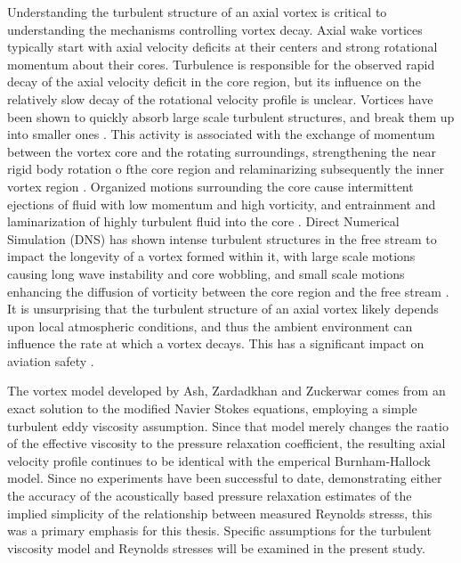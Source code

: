 Understanding the turbulent structure of an axial vortex is critical to 
understanding the mechanisms controlling vortex decay. Axial wake vortices 
typically 
start with axial velocity deficits at their centers and strong rotational 
momentum about their cores. Turbulence is responsible for the observed rapid 
decay of the axial velocity deficit in the core region, but its influence on 
the relatively slow decay of the rotational velocity profile is  unclear. 
Vortices have been shown to quickly absorb large 
scale turbulent structures, and break them up into smaller ones 
\cite{ragab1994,beninati2005}. This activity 
is associated with the exchange of momentum between the vortex core and the 
rotating surroundings, strengthening the near rigid body rotation o fthe core 
region and relaminarizing subsequently the inner vortex region 
\cite{bandyopadhyay1991}. Organized motions surrounding the core 
cause intermittent ejections of fluid with low momentum and high vorticity, and 
entrainment and laminarization of highly turbulent fluid into the core 
\cite{bandyopadhyay1991}. Direct Numerical Simulation (DNS) has shown 
intense turbulent structures in the free stream to impact the longevity of a 
vortex formed within it, with large scale motions causing long wave instability 
and core wobbling, and small scale motions enhancing the diffusion of vorticity 
between the core region and the free stream \cite{risso1997}. It is 
unsurprising that the turbulent structure of an axial vortex likely depends
upon local atmospheric conditions, and thus the ambient environment can 
influence the rate at which a vortex decays. This has a significant impact on 
aviation safety \cite{ash1998}.

The vortex model developed by Ash, Zardadkhan and Zuckerwar 
\cite{ash2011} comes from an exact solution to the modified
Navier Stokes equations, employing a simple turbulent eddy viscosity 
assumption. Since that model merely changes the raatio of the effective 
viscosity to the pressure relaxation coefficient, the resulting axial velocity 
profile continues to be identical with the emperical Burnham-Hallock model. 
Since no experiments have been successful to date, demonstrating either the 
accuracy of the acoustically based pressure relaxation estimates of the implied 
simplicity of the relationship between measured Reynolds stresss, this was a 
primary emphasis for this thesis. Specific 
assumptions for the turbulent viscosity model and Reynolds stresses will be 
examined in the present study.
